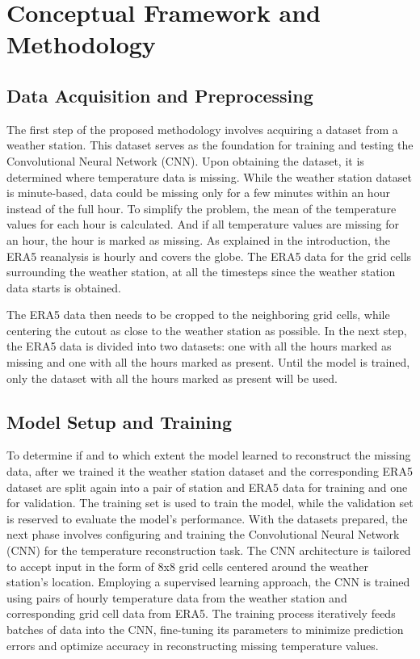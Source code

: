 \section{Conceptual Framework and Methodology}
\label{sec:design}

\subsection{Data Acquisition and Preprocessing}
The first step of the proposed methodology involves acquiring a dataset from a weather station. This dataset serves as the foundation for training and testing the Convolutional Neural Network (CNN). Upon obtaining the dataset, it is determined where temperature data is missing. While the weather station dataset is minute-based, data could be missing only for a few minutes within an hour instead of the full hour. To simplify the problem, the mean of the temperature values for each hour is calculated. And if all temperature values are missing for an hour, the hour is marked as missing. As explained in the introduction, the ERA5 reanalysis is hourly and covers the globe. The ERA5 data for the grid cells surrounding the weather station, at all the timesteps since the weather station data starts is obtained.

The ERA5 data then needs to be cropped to the neighboring grid cells, while centering the cutout as close to the weather station as possible. In the next step, the ERA5 data is divided into two datasets: one with all the hours marked as missing and one with all the hours marked as present. Until the model is trained, only the dataset with all the hours marked as present will be used.

\subsection{Model Setup and Training}
To determine if and to which extent the model learned to reconstruct the missing data, after we trained it the weather station dataset and the corresponding ERA5 dataset are split again into a pair of station and ERA5 data for training and one for validation. The training set is used to train the model, while the validation set is reserved to evaluate the model's performance. With the datasets prepared, the next phase involves configuring and training the Convolutional Neural Network (CNN) for the temperature reconstruction task. The CNN architecture is tailored to accept input in the form of 8x8 grid cells centered around the weather station's location. Employing a supervised learning approach, the CNN is trained using pairs of hourly temperature data from the weather station and corresponding grid cell data from ERA5. The training process iteratively feeds batches of data into the CNN, fine-tuning its parameters to minimize prediction errors and optimize accuracy in reconstructing missing temperature values.

